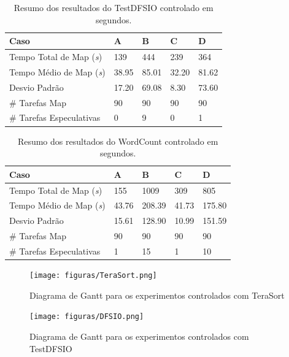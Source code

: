 \begin{table}[h!]
	\caption{Resumo dos resultados do TestDFSIO controlado em segundos.} \label{tab:exp1IO}
	\begin{tabular*}{\hsize}{lllll} %
		\textbf{Caso} & \textbf{A} & \textbf{B} & \textbf{C} & \textbf{D}\\
		\hline
		Tempo Total de Map ({\it{s}}) & 139 & 444 & 239 & 364 \\
		Tempo Médio de Map ({\it{s}}) & 38.95 & 85.01 & 32.20 & 81.62 \\
		Desvio Padrão & 17.20 & 69.08 & 8.30 & 73.60 \\
		\# Tarefas Map & 90 & 90 & 90 & 90 \\
		\# Tarefas Especulativas & 0 & 9 & 0 & 1 \\
	\end{tabular*}
\end{table}


\begin{table}[h!]
	\caption{Resumo dos resultados do WordCount controlado em segundos.} \label{tab:exp1WC}
	\begin{tabular*}{\hsize}{lllll} %
		\textbf{Caso} & \textbf{A} & \textbf{B} & \textbf{C} & \textbf{D}\\
		\hline
		Tempo Total de Map ({\it{s}}) & 155 & 1009 & 309 & 805 \\
		Tempo Médio de Map ({\it{s}}) & 43.76 & 208.39 & 41.73 & 175.80 \\
		Desvio Padrão & 15.61 & 128.90 & 10.99 & 151.59 \\
		\# Tarefas Map & 90 & 90 & 90 & 90 \\
		\# Tarefas Especulativas & 1 & 15 & 1 & 10 \\
	\end{tabular*}
\end{table}

\begin{figure}[!ht]
	\centering
	\texttt{[image: figuras/TeraSort.png]}
	\caption{Diagrama de Gantt para os experimentos controlados com TeraSort}
	\label{fig:exp1TS}
\end{figure}

\begin{figure}[!ht]
	\centering
	\texttt{[image: figuras/DFSIO.png]}%
	\caption{Diagrama de Gantt para os experimentos controlados com TestDFSIO}
	\label{fig:exp1IO}
\end{figure}

